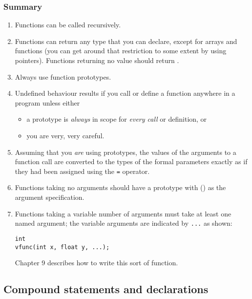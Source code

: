   \subsubsection{Summary}
    \begin{enumerate}
     \item Functions can be called recursively.
     \item Functions can return any type that you can declare, except for
      arrays and functions (you can get around that restriction to some
      extent by using pointers). Functions returning no value should return
      \void.
     \item Always use function prototypes.
     \item Undefined behaviour results if you call or define a function
      anywhere in a program unless either
      \begin{itemize}
       \item a prototype is \textit{always} in scope for \textit{every call}
        or definition, or
       \item you are very, very careful.
      \end{itemize}
     
     \item Assuming that you \textit{are} using prototypes, the values of the
      arguments to a function call are converted to the types of the formal
      parameters exactly as if they had been assigned using
      the \texttt{=} operator.
     \item Functions taking no arguments should have a prototype with
      (\void{}) as the argument specification.
     \item 
      Functions taking a variable number of arguments must take at least
       one named argument; the variable arguments are indicated
       by \texttt{...} as shown:

\begin{Verbatim}
int
vfunc(int x, float y, ...);
\end{Verbatim}

      Chapter 9 describes how to write this sort of
       function.

     
    \end{enumerate}
  

 

  \subsection{Compound statements and declarations}
   

